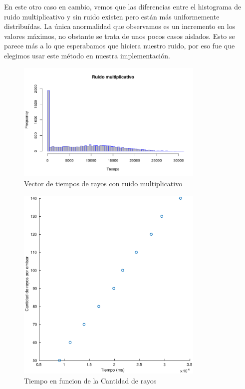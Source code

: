 \par En este otro caso en cambio, vemos que las diferencias entre el histograma de ruido multiplicativo y sin ruido existen pero están más uniformemente distribuídas. La única anormalidad que observamos es un incremento en los valores máximos, no obstante se trata de unos pocos casos aislados.
Esto se parece más a lo que esperabamos que hiciera nuestro ruido, por eso fue que elegimos usar este método en nuestra implementación.
\begin{figure}[H]
	\centering	\includegraphics[width=0.8\textwidth]{img/ruidoMultiplicativo.png}
	\caption{Vector de tiempos de rayos con ruido multiplicativo}
	\label{fig:etiqueta}
\end{figure}



\begin{figure}[H]
	\centering	\includegraphics[width=0.8\textwidth]{img/cantrayos_tiempo}
	\caption{Tiempo en funcion de la Cantidad de rayos}
	\label{fig:cantrayos_tiempo}
\end{figure}



